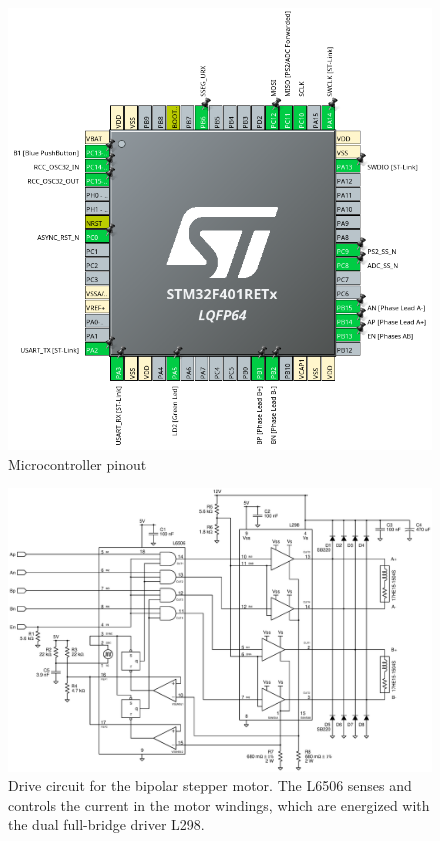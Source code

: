 \documentclass[]{article}
\begin{document}
\begin{figure}
    \centering
    \includegraphics[width=.65\linewidth]{../gfx/mcu_pinout.png}
    \caption{Microcontroller pinout}
    \label{fig:mcu_pins}
\end{figure}

\begin{figure}
    \centering
    \includegraphics[width=.8\linewidth]{../gfx/motor_board.eps}
    \caption{Drive circuit for the bipolar stepper motor. The L6506 senses and controls the current in the motor windings, which are energized with the dual full-bridge driver L298.}
    \label{fig:motor_bd}
\end{figure}
\end{document}
